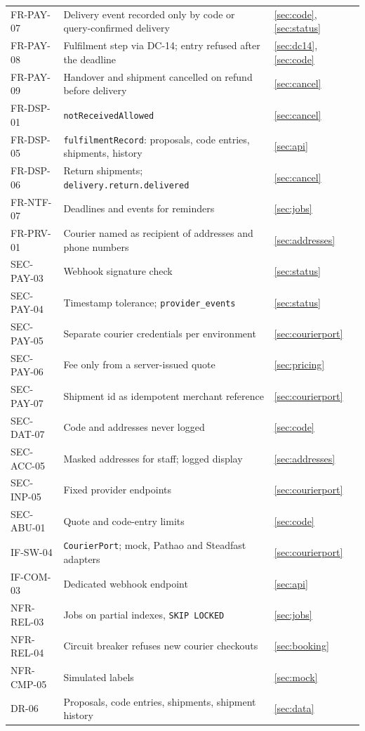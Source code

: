 \documentclass[11pt,a4paper]{article}
\begin{document}
{\begin{longtable}{@{}>{\ttfamily}p{2.4cm}>{\raggedright\arraybackslash}p{10.6cm}>{\raggedright\arraybackslash}p{2.2cm}@{}}
FR-PAY-07 & Delivery event recorded only by code or query-confirmed delivery & \ref{sec:code}, \ref{sec:status} \\
FR-PAY-08 & Fulfilment step via DC-14; entry refused after the deadline & \ref{sec:dc14}, \ref{sec:code} \\
FR-PAY-09 & Handover and shipment cancelled on refund before delivery & \ref{sec:cancel} \\
FR-DSP-01 & \texttt{notReceivedAllowed} & \ref{sec:cancel} \\
FR-DSP-05 & \texttt{fulfilmentRecord}: proposals, code entries, shipments, history & \ref{sec:api} \\
FR-DSP-06 & Return shipments; \texttt{delivery.return.delivered} & \ref{sec:cancel} \\
FR-NTF-07 & Deadlines and events for reminders & \ref{sec:jobs} \\
FR-PRV-01 & Courier named as recipient of addresses and phone numbers & \ref{sec:addresses} \\
SEC-PAY-03 & Webhook signature check & \ref{sec:status} \\
SEC-PAY-04 & Timestamp tolerance; \texttt{provider\_events} & \ref{sec:status} \\
SEC-PAY-05 & Separate courier credentials per environment & \ref{sec:courierport} \\
SEC-PAY-06 & Fee only from a server-issued quote & \ref{sec:pricing} \\
SEC-PAY-07 & Shipment id as idempotent merchant reference & \ref{sec:courierport} \\
SEC-DAT-07 & Code and addresses never logged & \ref{sec:code} \\
SEC-ACC-05 & Masked addresses for staff; logged display & \ref{sec:addresses} \\
SEC-INP-05 & Fixed provider endpoints & \ref{sec:courierport} \\
SEC-ABU-01 & Quote and code-entry limits & \ref{sec:code} \\
IF-SW-04 & \texttt{CourierPort}; mock, Pathao and Steadfast adapters & \ref{sec:courierport} \\
IF-COM-03 & Dedicated webhook endpoint & \ref{sec:api} \\
NFR-REL-03 & Jobs on partial indexes, \texttt{SKIP LOCKED} & \ref{sec:jobs} \\
NFR-REL-04 & Circuit breaker refuses new courier checkouts & \ref{sec:booking} \\
NFR-CMP-05 & Simulated labels & \ref{sec:mock} \\
DR-06 & Proposals, code entries, shipments, shipment history & \ref{sec:data} \\
\bottomrule
\end{longtable}}
\end{document}
